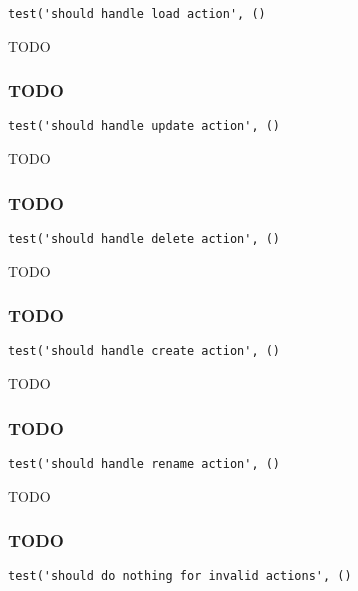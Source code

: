 \documentclass[a4paper]{article}
\begin{document}
\begin{lstlisting}
test('should handle load action', ()
\end{lstlisting}

TODO

\hypertarget{toc606}{}
\subsubsection{TODO}

\begin{lstlisting}
test('should handle update action', ()
\end{lstlisting}

TODO

\hypertarget{toc607}{}
\subsubsection{TODO}

\begin{lstlisting}
test('should handle delete action', ()
\end{lstlisting}

TODO

\hypertarget{toc608}{}
\subsubsection{TODO}

\begin{lstlisting}
test('should handle create action', ()
\end{lstlisting}

TODO

\hypertarget{toc609}{}
\subsubsection{TODO}

\begin{lstlisting}
test('should handle rename action', ()
\end{lstlisting}

TODO

\hypertarget{toc610}{}
\subsubsection{TODO}

\begin{lstlisting}
test('should do nothing for invalid actions', ()
\end{lstlisting}
\end{document}
